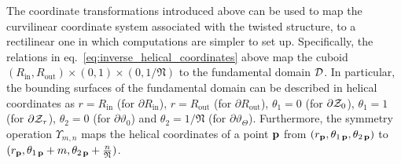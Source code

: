 \documentclass[preprint,12pt, 3p, sort&compress]{elsarticle}
\begin{document}
The coordinate transformations introduced above can be used to map the curvilinear coordinate system associated with the twisted structure, to a rectilinear one in which computations are simpler to set up. Specifically, the relations in eq.~\ref{eq:inverse_helical_coordinates} above map the cuboid $(R_{\text{in}},R_{\text{out}})\times(0,1)\times(0,1/\mathfrak{N})$ to the fundamental domain ${\cal D}$. In particular, the bounding surfaces of the fundamental domain can be described in helical coordinates as $r= R_{\text{in}}$ (for $\partial R_{\text{in}}$), $r= R_{\text{out}}$ (for $\partial R_{\text{out}}$), $\theta_{1} = 0$ (for $\partial {\cal Z}_0$), $\theta_{1} = 1$ (for $\partial {\cal Z}_{\tau}$), $\theta_{2} = 0$ (for $\partial \vartheta_0$) and $\theta_{2} = 1/{\mathfrak{N}}$ (for $\partial \vartheta_{\Theta}$). Furthermore, the symmetry operation $\Upsilon_{m,n}$ maps the helical coordinates of a point ${\bf p}$ from $(r_{{\bf p}},\theta_{1\,{{\bf p}}},\theta_{2\,{{\bf p}}})$ to $(r_{{\bf p}},\theta_{1\,{{\bf p}}} + m,\theta_{2\,{{\bf p}}} + \frac{n}{\mathfrak{N}})$.
\end{document}
